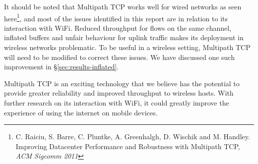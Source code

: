 It should be noted that Multipath TCP works well for wired 
networks as seen here\footnote{C. Raiciu, S. Barre, C. Pluntke, A. Greenhalgh, 
D. Wischik and M. Handley. Improving Datacenter Performance and Robustness with 
Multipath TCP, \textit{ACM Sigcomm 2011}}, and most of the issues identified
in this report are in relation to its interaction with WiFi. Reduced throughput
for flows on the same channel, inflated buffers and unfair behaviour for uplink
traffic makes its deployment in wireless networks problematic. To be useful in a
wireless setting, Multipath TCP will need to be modified to correct these issues.
We have discussed one such improvement in
\S\ref{sec:results-inflated}.

Multipath TCP is an exciting technology that we believe has the potential to 
provide greater reliability and improved throughput to wireless hosts. With
further research on its interaction with WiFi, it could greatly improve the
experience of using the internet on mobile devices.

